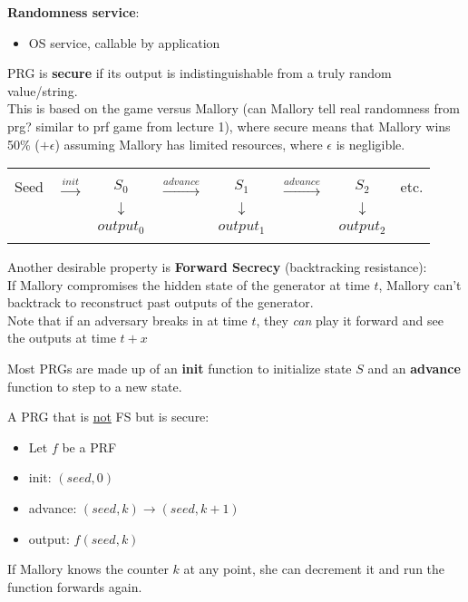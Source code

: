 {\bf Randomness service}:
\begin{itemize}
    \item OS service, callable by application
    
\end{itemize}

\begin{definition}
PRG is {\bf secure} if its output is indistinguishable from a truly random
value/string.\\ This is based on the game versus Mallory (can Mallory
tell real randomness from prg? similar to prf game from lecture 1),
where secure means that Mallory wins 50\% ($+\epsilon$) assuming
Mallory has limited resources, where $\epsilon$ is negligible.
\end{definition}

\begin{tabular}{cccccccc}
&&&&&&& \\
Seed & $\xrightarrow{init}$ & $ S_0 $ & $\xrightarrow{advance}$ & $ S_1$ & $\xrightarrow{advance}$ & $S_2$ & etc.\\
& & $\downarrow$ & & $\downarrow$ & &  $\downarrow$ &\\
& & $output_0$ & & $output_1$ & &  $output_2$ &\\
&&&&&&&
\end{tabular}

Another desirable property is {\bf Forward Secrecy} (backtracking resistance):\\
If Mallory compromises the hidden state of the generator at time $t$, Mallory
can't backtrack to reconstruct past outputs of the generator.\\

Note that if an adversary breaks in at time $t$, they \textit{can} play it forward and see the outputs at time $t + x$

Most PRGs are made up of an \textbf{init} function to initialize state
$S$ and an \textbf{advance} function to step to a new state.

\begin{example}{A PRG that is \underline{not} FS but is secure:}
    \begin{itemize}
    \item Let $f$ be a PRF
    \item init: $(seed, 0)$
    \item advance: $(seed, k) \rightarrow (seed, k + 1)$
    \item output: $f(seed, k)$
    \end{itemize}
    If Mallory knows the counter $k$ at any point, she can decrement it and run the function forwards again. 
\end{example}

